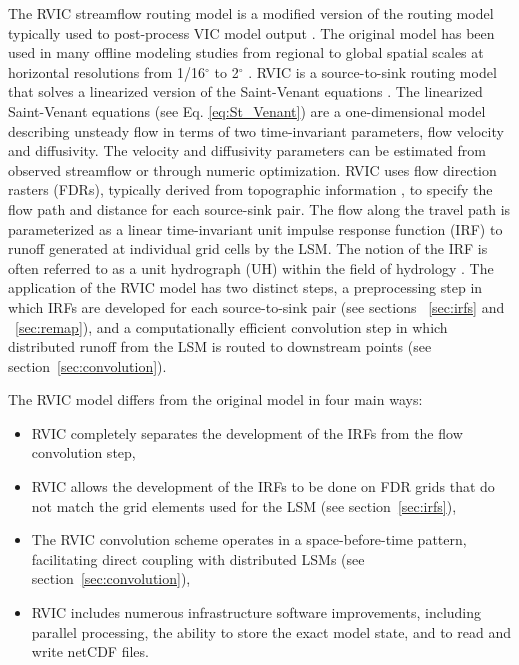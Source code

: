 \documentclass[jgrga, draft]{agutex}
\begin{document}
\begin{article}
The RVIC streamflow routing model is a modified version of the routing model typically used to post-process VIC model output \citep{Lohmann_1996, Lohmann_1998a}.
The original \citet{Lohmann_1996} model has been used in many offline modeling studies from regional to global spatial scales at horizontal resolutions from 1/16$^{\circ}$ to 2$^{\circ}$ \citep[e.g.][]{Nijssen_1997,Lohmann_1998b,Su_2005,Hamlet_2013}.
RVIC is a source-to-sink routing model that solves a linearized version of the Saint-Venant equations \citep{Fread_1992,Mesa_1986}.
The linearized Saint-Venant equations (see Eq. \ref{eq:St_Venant}) are a one-dimensional model describing unsteady flow in terms of two time-invariant parameters, flow velocity and diffusivity.
The velocity and diffusivity parameters can be estimated from observed streamflow or through numeric optimization.
RVIC uses flow direction rasters (FDRs), typically derived from topographic information \citep[e.g.][]{Wu_2011}, to specify the flow path and distance for each source-sink pair.
The flow along the travel path is parameterized as a linear time-invariant unit impulse response function (IRF) to runoff generated at individual grid cells by the LSM.
The notion of the IRF is often referred to as a unit hydrograph (UH) within the field of hydrology \citep[e.g.][]{Sherman_1932,Nash_1957}.
The application of the RVIC model has two distinct steps, a preprocessing step in which IRFs are developed for each source-to-sink pair (see sections ~\ref{sec:irfs} and ~\ref{sec:remap}), and a computationally efficient convolution step in which distributed runoff from the LSM is routed to downstream points (see section~\ref{sec:convolution}).

The RVIC model differs from the original \citet{Lohmann_1996} model in four main ways:

\begin{itemize}[leftmargin=+.5in]
\item RVIC completely separates the development of the IRFs from the flow convolution step,
\item RVIC allows the development of the IRFs to be done on FDR grids that do not match the grid elements used for the LSM (see section~\ref{sec:irfs}),
\item The RVIC convolution scheme operates in a space-before-time pattern, facilitating direct coupling with distributed LSMs (see section~\ref{sec:convolution}),
\item RVIC includes numerous infrastructure software improvements, including parallel processing, the ability to store the exact model state, and to read and write netCDF files.
\end{itemize}


\end{article}
\end{document}
